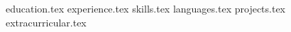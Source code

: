 \documentclass[letterpaper,11pt]{article}
\begin{document}

{education.tex}
{experience.tex}
\sidebyside
    {{skills.tex}}
    {{languages.tex}}
{projects.tex}
{extracurricular.tex}

\pagebreak
\end{document}
